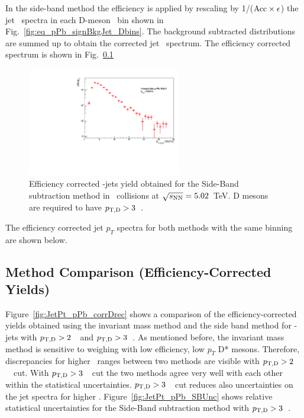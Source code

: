 
In the side-band method the efficiency is applied by rescaling by 1/(${\rm Acc} \times \epsilon$) the jet \pt\ spectra in each D-meson \pt\ bin shown in 
Fig.~\ref{fig:eq_pPb_signBkgJet_Dbins}. 
The background subtracted distributions are summed up to obtain the corrected jet \pt\ spectrum. The efficiency corrected spectrum is shown in Fig.~\ref{}

\begin{figure}[bth]
\centering
\includegraphics[width=0.6\textwidth]{pPbplots/plotsSB_pt3_noDetails/jetPtSpectrum_SB_FASTwoSDD_pTD3}
\caption{Efficiency corrected \Dstar-jets yield obtained for the Side-Band subtraction method in \pPb\ collisions at $\sqrt{s_{\rm NN}}=5.02$~TeV. D mesons are required to have $p_{\mathrm{T,D}}>3$~\GeVc.}
\label{fig:eq_pPb_InvMass_corrDrec}
\end{figure}

The efficiency corrected jet $p_{T}$ spectra for both methods with the same binning are shown below.

\subsection{Method Comparison (Efficiency-Corrected Yields)}

Figure~\ref{fig:JetPt_pPb_corrDrec} shows a comparison of the efficiency-corrected yields obtained using the invariant mass method and the side band method
for \Dstar-jets with $p_{\mathrm{T,D}}>2$~\GeVc\ and $p_{\mathrm{T,D}}>3$~\GeVc. 
As mentioned before, the invariant mass method is sensitive to weighing with low efficiency, low $p_{T}$ D* mesons. Therefore, discrepancies for higher \ptjet\ ranges between two methods are visible with $p_{\mathrm{T,D}}>2$~\GeVc\ cut. With $p_{\mathrm{T,D}}>3$~\GeVc\ cut the two methods agree very well with each other within the statistical uncertainties.
$p_{\mathrm{T,D}}>3$~\GeVc\ cut reduces also uncertainties on the jet spectra for higher \ptjet. Figure~\ref{fig:JetPt_pPb_SBUnc} shows relative statistical uncertainties for the Side-Band subtraction method with $p_{\mathrm{T,D}}>3$~\GeVc.

